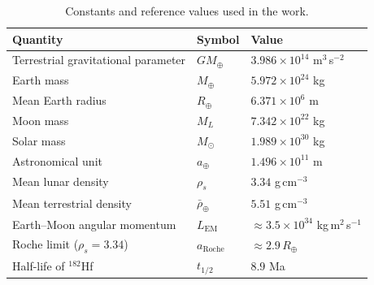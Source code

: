\documentclass[11pt,a4paper,openany]{report}
\newcommand{\Mt}{M_{\oplus}}
\newcommand{\Rt}{R_{\oplus}}
\newcommand{\aR}{a_{\mathrm{Roche}}}
\begin{document}
\begin{table}[htbp]
\centering
\small
\caption{Constants and reference values used in the work.}
\label{tab:constantes}
\begin{tabular}{lll}
\toprule
\textbf{Quantity} & \textbf{Symbol} & \textbf{Value} \\
\midrule
Terrestrial gravitational parameter & $G\Mt$ & $3.986\times10^{14}$ m$^3$\,s$^{-2}$ \\
Earth mass & $\Mt$ & $5.972\times10^{24}$ kg \\
Mean Earth radius & $\Rt$ & $6.371\times10^{6}$ m \\
Moon mass & $M_L$ & $7.342\times10^{22}$ kg \\
Solar mass & $M_\odot$ & $1.989\times10^{30}$ kg \\
Astronomical unit & $a_\oplus$ & $1.496\times10^{11}$ m \\
Mean lunar density & $\rho_s$ & $3.34$ g\,cm$^{-3}$ \\
Mean terrestrial density & $\bar\rho_\oplus$ & $5.51$ g\,cm$^{-3}$ \\
Earth--Moon angular momentum & $L_{\mathrm{EM}}$ & $\approx3.5\times10^{34}$ kg\,m$^2$\,s$^{-1}$ \\
Roche limit ($\rho_s=3.34$) & $\aR$ & $\approx2.9\,\Rt$ \\
Half-life of $^{182}$Hf & $t_{1/2}$ & $8.9$ Ma \\
\bottomrule
\end{tabular}
\end{table}
\end{document}
